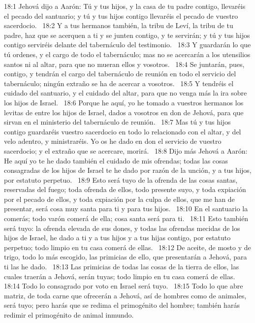 18:1 Jehová dijo a Aarón: Tú y tus hijos, y la casa de tu padre contigo, llevaréis el pecado del santuario; y tú y tus hijos contigo llevaréis el pecado de vuestro sacerdocio.  
18:2 Y a tus hermanos también, la tribu de Leví, la tribu de tu padre, haz que se acerquen a ti y se junten contigo, y te servirán; y tú y tus hijos contigo serviréis delante del tabernáculo del testimonio.  
18:3 Y guardarán lo que tú ordenes, y el cargo de todo el tabernáculo; mas no se acercarán a los utensilios santos ni al altar, para que no mueran ellos y vosotros.  
18:4 Se juntarán, pues, contigo, y tendrán el cargo del tabernáculo de reunión en todo el servicio del tabernáculo; ningún extraño se ha de acercar a vosotros.  
18:5 Y tendréis el cuidado del santuario, y el cuidado del altar, para que no venga más la ira sobre los hijos de Israel.  
18:6 Porque he aquí, yo he tomado a vuestros hermanos los levitas de entre los hijos de Israel, dados a vosotros en don de Jehová, para que sirvan en el ministerio del tabernáculo de reunión.  
18:7 Mas tú y tus hijos contigo guardaréis vuestro sacerdocio en todo lo relacionado con el altar, y del velo adentro, y ministraréis. Yo os he dado en don el servicio de vuestro sacerdocio; y el extraño que se acercare, morirá.  
18:8 Dijo más Jehová a Aarón: He aquí yo te he dado también el cuidado de mis ofrendas; todas las cosas consagradas de los hijos de Israel te he dado por razón de la unción, y a tus hijos, por estatuto perpetuo.  
18:9 Esto será tuyo de la ofrenda de las cosas santas, reservadas del fuego; toda ofrenda de ellos, todo presente suyo, y toda expiación por el pecado de ellos, y toda expiación por la culpa de ellos, que me han de presentar, será cosa muy santa para ti y para tus hijos.  
18:10 En el santuario la comerás; todo varón comerá de ella; cosa santa será para ti.  
18:11 Esto también será tuyo: la ofrenda elevada de sus dones, y todas las ofrendas mecidas de los hijos de Israel, he dado a ti y a tus hijos y a tus hijas contigo, por estatuto perpetuo; todo limpio en tu casa comerá de ellas.  
18:12 De aceite, de mosto y de trigo, todo lo más escogido, las primicias de ello, que presentarán a Jehová, para ti las he dado.  
18:13 Las primicias de todas las cosas de la tierra de ellos, las cuales traerán a Jehová, serán tuyas; todo limpio en tu casa comerá de ellas.  
18:14 Todo lo consagrado por voto en Israel será tuyo.  
18:15 Todo lo que abre matriz, de toda carne que ofrecerán a Jehová, así de hombres como de animales, será tuyo; pero harás que se redima el primogénito del hombre; también harás redimir el primogénito de animal inmundo.  
